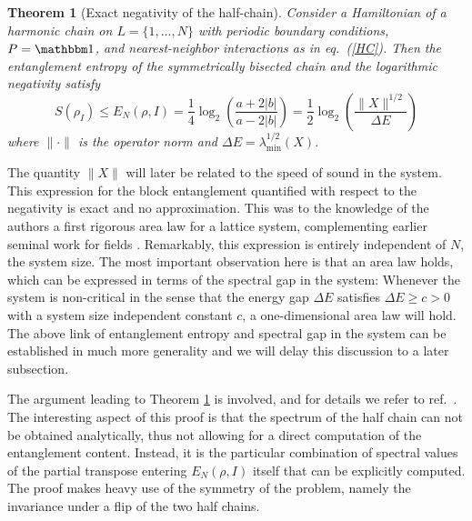 \documentclass[rmp,twocolumn,floatfix,epsfig,graphics]{revtex4} %
\newtheorem{theorem}{Theorem}
\begin{document}
\begin{theorem}[Exact negativity of the half-chain]
\label{T1}
        Consider a Hamiltonian of a harmonic chain on 
        $L=\{1,\dots, N\}$ with
        periodic boundary conditions, $P=\id$, and nearest-neighbor 
        interactions as in eq.\  (\ref{HC}).
        Then the entanglement entropy of the symmetrically
        bisected chain and the logarithmic negativity satisfy
        \begin{equation}\label{halfent}
                S(\rho_I)\leq E_{N}(\rho,I) = \frac{1}{4}\log_2 
                \left(
                \frac{a+2|b|}{a-2|b|}
                \right)
                = \frac{1}{2}\log_2 
                \left(
                \frac{ \|X\|^{1/2}}{\Delta E}
                \right)
        \end{equation}
where $\|\cdot \|$ is the operator norm and 
$\Delta E = \lambda^{1/2}_{\text{min}}(X)$.      
\end{theorem}

The quantity $\|X\|$ will later be related to the speed of sound 
in the system. This expression for the block entanglement quantified 
with respect to the negativity is exact and no approximation. This 
was to the knowledge of the authors a first rigorous area law for 
a lattice system, complementing earlier seminal work for fields \cite{Callan}. 
Remarkably, this expression is entirely independent 
of $N$, the system size. The most important observation here is 
that an area law holds, which can be expressed in terms of the
spectral gap in the system: Whenever the system is 
non-critical in the sense that the energy gap $\Delta E$ satisfies
$\Delta E \ge c > 0$ with a system size independent constant $c$, 
a one-dimensional area law will hold.
%
The above link of entanglement entropy and spectral
gap in the system can be established in much more generality 
and we will delay this discussion to a later subsection. 

The argument leading to Theorem \ref{T1} is involved, and for 
details we refer to ref.\ \cite{Harmonic}. The  interesting 
aspect of this proof is that the spectrum of the half chain 
can not be obtained analytically, thus not allowing for a 
direct computation of the entanglement content. Instead, it 
is the particular combination of spectral values of the 
partial transpose entering $E_{N}(\rho,I)$ itself that can be 
explicitly computed. The proof makes heavy use of the symmetry 
of the problem, namely the invariance under a flip of the two 
half chains. 
\end{document}
